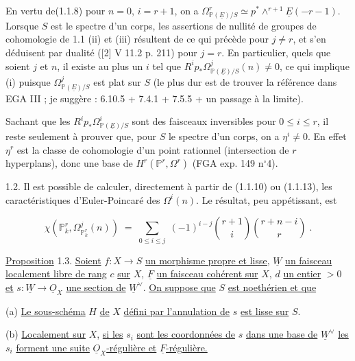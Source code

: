 En vertu de(1.1.8) pour $n = 0$, $i = r+1$, on a $\Omega^r_{\mathbb{P}(\underline{E})/S} \simeq p^* \wedge^{r+1} \underline{E}(-r-1)$. Lorsque $S$ est le spectre d'un corps, les assertions de nullité de groupes de cohomologie de 1.1 (ii) et (iii) résultent de ce qui précède pour $j \neq r$, et s'en déduisent par dualité ([2] V 11.2 p. 211) pour $j = r$. En particulier, quels que soient $j$ et $n$, il existe au plus un $i$ tel que $R^i p_* \Omega^j_{\mathbb{P}(\underline{E})/S}(n) \neq 0$, ce qui implique (i) puisque $\Omega^j_{\mathbb{P}(\underline{E})/S}$ est plat sur $S$ (le plus dur est de trouver la référence dans EGA III ; je suggère : 6.10.5 + 7.4.1 + 7.5.5 + un passage à la limite).

Sachant que les $R^i p_* \Omega^i_{\mathbb{P}(\underline{E})/S}$ sont des faisceaux inversibles pour $0 \leq i \leq r$, il reste seulement à prouver que, pour $S$ le spectre d'un corps, on a $\eta^i \neq 0$. En effet $\eta^r$ est la classe de cohomologie d'un point rationnel (intersection de $r$ hyperplans), donc une base de $H^r(\mathbb{P}^r,\Omega^r)$ (FGA exp. 149 n$^{\circ}$4).

1.2. Il est possible de calculer, directement à partir de (1.1.10) ou (1.1.13), les caractéristiques d'Euler-Poincaré des $\Omega^i(n)$. Le résultat, peu appétissant, est

\begin{equation*}
\chi(\mathbb{P}^r_k,\Omega^j_{\mathbb{P}^r_k}(n)) \;=\; \sum_{0 \leq i \leq j} \; (-1)^{i-j} \binom{r+1}{i}\binom{r+n-i}{r} \; .
\end{equation*}


\underline{Proposition} 1.3. \underline{Soient} $f : X \longrightarrow S$ \underline{un morphisme propre et lisse,} $\underline{W}$ \underline{un faisceau localement libre de rang} $c$ \underline{sur} $X$, $\underline{F}$ \underline{un faisceau cohérent sur} $X$, $d$ \underline{un entier} $> 0$ \underline{et} $s : \underline{W} \longrightarrow \underline{O}_X$ \underline{une section de} $\underline{W}^{\vee}$. \underline{On suppose que} $S$ \underline{est noethérien et que}

(a) \underline{Le sous-schéma} $H$ \underline{de} $X$ \underline{défini par l'annulation de} $s$ \underline{est lisse sur} $S$.

(b) \underline{Localement sur} $X$, \underline{si les} $s_i$ \underline{sont les coordonnées de} $s$ \underline{dans une base de} $\underline{W}^{\vee}$ \underline{les} $s_i$ \underline{forment une suite} $\underline{O}_X$\underline{-régulière et} $\underline{F}$\underline{-régulière.}

